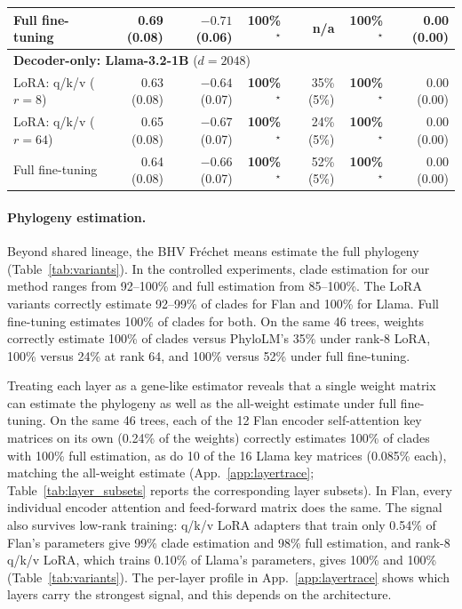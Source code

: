 \documentclass{article}
\theoremstyle{definition}
\theoremstyle{plain}
\begin{document}
\begin{table}[h]
\begin{center}
{\begin{tabular}{lrrrrrr}
\quad Full fine-tuning                  & 0.69 (0.08) & $-0.71$ (0.06) & \textbf{100\%}$^\star$ & n/a & \textbf{100\%}$^\star$ & 0.00 (0.00) \\
\midrule
\multicolumn{7}{l}{\textbf{Decoder-only: Llama-3.2-1B} ($d=2048$)} \\
\quad LoRA: q/k/v ($r{=}8$)              & 0.63 (0.08) & $-0.64$ (0.07) & \textbf{100\%}$^\star$ & 35\% (5\%) & \textbf{100\%}$^\star$ & 0.00 (0.00) \\
\quad LoRA: q/k/v ($r{=}64$)             & 0.65 (0.08) & $-0.67$ (0.07) & \textbf{100\%}$^\star$ & 24\% (5\%) & \textbf{100\%}$^\star$ & 0.00 (0.00) \\
\quad Full fine-tuning                   & 0.64 (0.08) & $-0.66$ (0.07) & \textbf{100\%}$^\star$ & 52\% (5\%) & \textbf{100\%}$^\star$ & 0.00 (0.00) \\
\bottomrule
\end{tabular}
}
\end{center}
\end{table}



\paragraph{Phylogeny estimation.}
\label{sec:results:weighttree}
Beyond shared lineage, the BHV Fr\'echet means estimate the full phylogeny (Table~\ref{tab:variants}). In the controlled experiments, clade estimation for our method ranges from 92--100\% and full estimation from 85--100\%. The LoRA variants correctly estimate 92--99\% of clades for Flan and 100\% for Llama. Full fine-tuning estimates 100\% of clades for both. On the same 46 trees, weights correctly estimate 100\% of clades versus PhyloLM's 35\% under rank-8 LoRA, 100\% versus 24\% at rank 64, and 100\% versus 52\% under full fine-tuning.

Treating each layer as a gene-like estimator reveals that a single weight matrix can estimate the phylogeny as well as the all-weight estimate under full fine-tuning. On the same 46 trees, each of the 12 Flan encoder self-attention key matrices on its own (0.24\% of the weights) correctly estimates 100\% of clades with 100\% full estimation, as do 10 of the 16 Llama key matrices (0.085\% each), matching the all-weight estimate (App.~\ref{app:layertrace}; Table~\ref{tab:layer_subsets} reports the corresponding layer subsets). In Flan, every individual encoder attention and feed-forward matrix does the same. The signal also survives low-rank training: q/k/v LoRA adapters that train only 0.54\% of Flan's parameters give 99\% clade estimation and 98\% full estimation, and rank-8 q/k/v LoRA, which trains 0.10\% of Llama's parameters, gives 100\% and 100\% (Table~\ref{tab:variants}). The per-layer profile in App.~\ref{app:layertrace} shows which layers carry the strongest signal, and this depends on the architecture.
\end{document}
